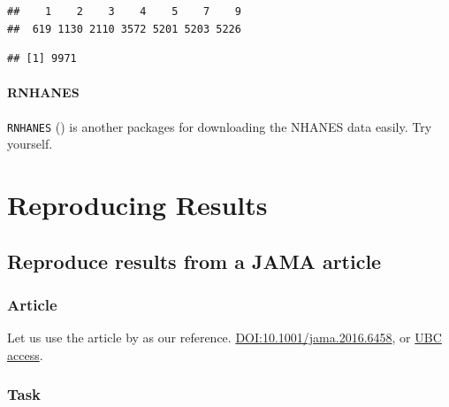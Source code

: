 \documentclass[
]{book}
\newenvironment{Shaded}{\begin{snugshade}}{\end{snugshade}}
\newcommand{\FunctionTok}[1]{\textcolor[rgb]{0.00,0.00,0.00}{#1}}
\newcommand{\NormalTok}[1]{#1}
\newcommand{\SpecialCharTok}[1]{\textcolor[rgb]{0.00,0.00,0.00}{#1}}
\begin{document}
\begin{verbatim}
##    1    2    3    4    5    7    9 
##  619 1130 2110 3572 5201 5203 5226
\end{verbatim}

\begin{Shaded}
\end{Shaded}

\begin{verbatim}
## [1] 9971
\end{verbatim}

\hypertarget{rnhanes}{%
\subsubsection{RNHANES}\label{rnhanes}}

\texttt{RNHANES} (\citet{RNHANES}) is another packages for downloading the NHANES data easily. Try yourself.

\hypertarget{reproducing-results}{%
\chapter{Reproducing Results}\label{reproducing-results}}

\hypertarget{reproduce-results-from-a-jama-article}{%
\section{Reproduce results from a JAMA article}\label{reproduce-results-from-a-jama-article}}

\hypertarget{article}{%
\subsection{Article}\label{article}}

Let us use the article by \citet{flegal2016trends} as our reference. \href{https://jamanetwork.com/journals/jama/fullarticle/2526639}{DOI:10.1001/jama.2016.6458}, or \href{https://libkey.io/10.1001/jama.2016.6458}{UBC access}.

\hypertarget{task}{%
\subsection{Task}\label{task}}
\end{document}
